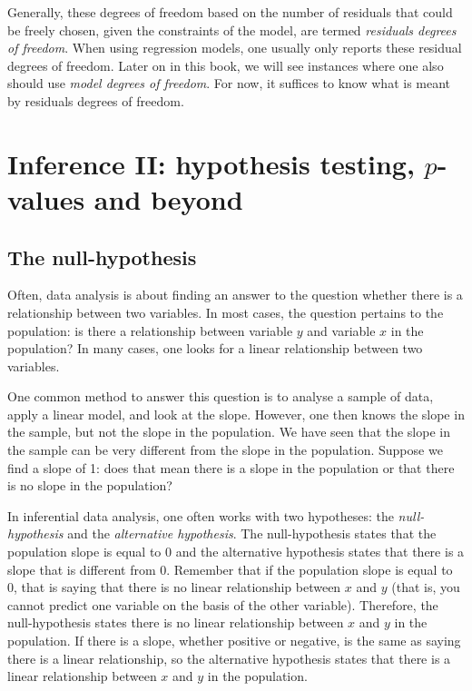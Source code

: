 \documentclass[]{report}\usepackage[]{graphicx}\usepackage[]{color}
\begin{document}
Generally, these degrees of freedom based on the number of residuals that could be freely chosen, given the constraints of the model, are termed \textit{residuals degrees of freedom}. When using regression models, one usually only reports these residual degrees of freedom. Later on in this book, we will see instances where one also should use \textit{model degrees of freedom}. For now, it suffices to know what is meant by residuals degrees of freedom.





\chapter{Inference II: hypothesis testing, $p$-values and beyond}\label{chap:hypothesis}

\section{The null-hypothesis}

Often, data analysis is about finding an answer to the question whether there is a relationship between two variables. In most cases, the question pertains to the population: is there a relationship between variable $y$ and variable $x$ in the population? In many cases, one looks for a linear relationship between two variables.

One common method to answer this question is to analyse a sample of data, apply a linear model, and look at the slope. However, one then knows the slope in the sample, but not the slope in the population. We have seen that the slope in the sample can be very different from the slope in the population. Suppose we find a slope of 1: does that mean there is a slope in the population or that there is no slope in the population?

In inferential data analysis, one often works with two hypotheses: the \textit{null-hypothesis} and the \textit{alternative hypothesis}. The null-hypothesis states that the population slope is equal to 0 and the alternative hypothesis states that there is a slope that is different from 0. Remember that if the population slope is equal to 0, that is saying that there is no linear relationship between $x$ and $y$ (that is, you cannot predict one variable on the basis of the other variable). Therefore, the null-hypothesis states there is no linear relationship between $x$ and $y$ in the population. If there is a slope, whether positive or negative, is the same as saying there is a linear relationship, so the alternative hypothesis states that there is a linear relationship between $x$ and $y$ in the population.
\end{document}
